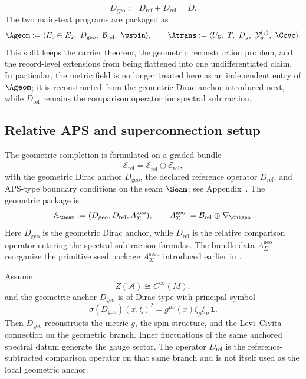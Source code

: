 \[
D_{\mathrm{geo}}:=D_{\mathrm{ref}}+D_{\mathrm{rel}}=D.
\]
The two main-text programs are packaged as
\[
\Ageom
:=
\langle E_3\oplus E_2,\ D_{\mathrm{geo}},\ \mathcal B_{\mathrm{rel}},\ \wspin\rangle,
\qquad
\Atrans
:=
\langle U_6,\ T,\ D_y,\ \mathcal Y_y^{(\varepsilon)},\ \Ccyc\rangle.
\]
This split keeps the carrier theorem, the geometric reconstruction problem, and the record-level extensions from being flattened into one undifferentiated claim. In particular, the metric field is no longer treated here as an independent entry of $\Ageom$; it is reconstructed from the geometric Dirac anchor introduced next, while $D_{\mathrm{rel}}$ remains the comparison operator for spectral subtraction.

\subsection{Relative APS and superconnection setup}

The geometric completion is formulated on a graded bundle
\[
\mathcal E_{\mathrm{rel}}=\mathcal E_{\mathrm{rel}}^+\oplus\mathcal E_{\mathrm{rel}}^-,
\]
with the geometric Dirac anchor $D_{\mathrm{geo}}$, the declared reference operator
$D_{\mathrm{ref}}$, and APS-type boundary conditions on the seam $\Seam$; see
Appendix~. The geometric package is
\[
\mathbb A_{\Seam}:=(D_{\mathrm{geo}},D_{\mathrm{rel}},A_{\Sigma}^{\mathrm{geo}}),
\qquad
A_{\Sigma}^{\mathrm{geo}}:=\mathcal B_{\mathrm{rel}}\oplus\nabla_{\chigeo}.
\]
Here $D_{\mathrm{geo}}$ is the geometric Dirac anchor, while $D_{\mathrm{rel}}$ is the relative comparison operator entering the spectral subtraction formulas. The bundle data $A_{\Sigma}^{\mathrm{geo}}$ reorganize the primitive seed package $A_{\Sigma}^{\mathrm{seed}}$ introduced earlier in .
\begin{theorem}
\label{thm:geometric-reconstruction-anchor}
\label{thm:geometric-reconstruction-from-Dgeo}
\label{thm:relative-geometric-reconstruction}
Assume
\[
Z(\mathcal A)\cong C^\infty(M),
\]
and the geometric anchor $D_{\mathrm{geo}}$ is of Dirac type with principal symbol
\[
\sigma(D_{\mathrm{geo}})(x,\xi)^2
=
g^{\mu\nu}(x)\xi_\mu\xi_\nu\,\mathbf 1.
\]
Then $D_{\mathrm{geo}}$ reconstructs the metric $g$, the spin structure, and the
Levi--Civita connection on the geometric branch. Inner fluctuations of the same anchored
spectral datum generate the gauge sector.
The operator $D_{\mathrm{rel}}$ is the reference-subtracted comparison operator on that
same branch and is not itself used as the local geometric anchor.
\end{theorem}

